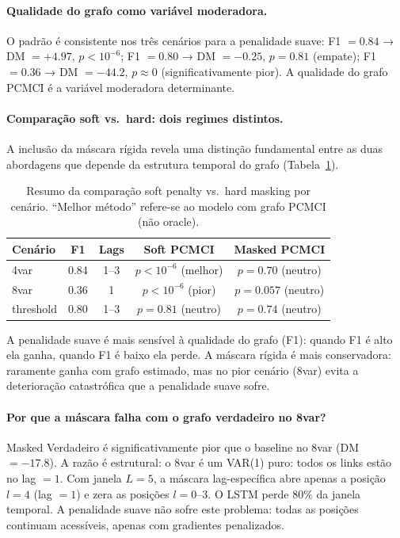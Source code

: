 \documentclass[12pt, a4paper]{article}
\begin{document}
\paragraph{Qualidade do grafo como variável moderadora.}
O padrão é consistente nos três cenários para a penalidade suave: F1 $= 0.84$ → DM $= +4.97$, $p < 10^{-6}$; F1 $= 0.80$ → DM $= -0.25$, $p = 0.81$ (empate); F1 $= 0.36$ → DM $= -44.2$, $p \approx 0$ (significativamente pior). A qualidade do grafo PCMCI é a variável moderadora determinante.

\paragraph{Comparação soft vs.\ hard: dois regimes distintos.}
A inclusão da máscara rígida revela uma distinção fundamental entre as duas abordagens que depende da estrutura temporal do grafo (Tabela~\ref{tab:soft_vs_hard_summary}).

\begin{table}[H]
\centering
\caption{Resumo da comparação soft penalty vs.\ hard masking por cenário. ``Melhor método'' refere-se ao modelo com grafo PCMCI (não oracle).}
\label{tab:soft_vs_hard_summary}
\begin{tabular}{lcccc}
\toprule
Cenário & F1 & Lags & Soft PCMCI & Masked PCMCI \\
\midrule
4var      & 0.84 & 1--3 & $p<10^{-6}$ (melhor) & $p=0.70$ (neutro) \\
8var      & 0.36 & 1    & $p<10^{-6}$ (pior)   & $p=0.057$ (neutro) \\
threshold & 0.80 & 1--3 & $p=0.81$ (neutro)    & $p=0.74$ (neutro) \\
\bottomrule
\end{tabular}
\end{table}

A penalidade suave é mais sensível à qualidade do grafo (F1): quando F1 é alto ela ganha, quando F1 é baixo ela perde. A máscara rígida é mais conservadora: raramente ganha com grafo estimado, mas no pior cenário (8var) evita a deterioração catastrófica que a penalidade suave sofre.

\paragraph{Por que a máscara falha com o grafo verdadeiro no 8var?}
Masked Verdadeiro é significativamente pior que o baseline no 8var (DM $= -17.8$). A razão é estrutural: o 8var é um VAR(1) puro: todos os links estão no lag $= 1$. Com janela $L = 5$, a máscara lag-específica abre apenas a posição $l = 4$ (lag $= 1$) e zera as posições $l = 0$--$3$. O LSTM perde 80\% da janela temporal. A penalidade suave não sofre este problema: todas as posições continuam acessíveis, apenas com gradientes penalizados.
\end{document}
